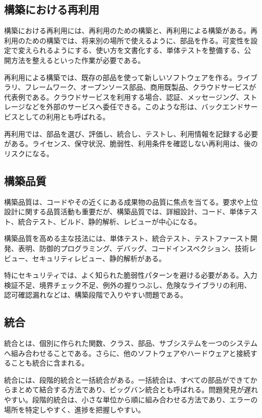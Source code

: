 \documentclass[a4paper,11pt,ja=standard,xelatex]{bxjsarticle}
\begin{document}
\subsection{構築における再利用}

構築における再利用には、再利用のための構築と、再利用による構築がある。再利用のための構築では、将来別の場所で使えるように、部品を作る。可変性を設定で変えられるようにする、使い方を文書化する、単体テストを整備する、公開方法を整えるといった作業が必要である。

再利用による構築では、既存の部品を使って新しいソフトウェアを作る。ライブラリ、フレームワーク、オープンソース部品、商用既製品、クラウドサービスが代表例である。クラウドサービスを利用する場合、認証、メッセージング、ストレージなどを外部のサービスへ委任できる。このような形は、バックエンドサービスとしての利用とも呼ばれる。

再利用では、部品を選び、評価し、統合し、テストし、利用情報を記録する必要がある。ライセンス、保守状況、脆弱性、利用条件を確認しない再利用は、後のリスクになる。

\subsection{構築品質}

構築品質は、コードやその近くにある成果物の品質に焦点を当てる。要求や上位設計に関する品質活動も重要だが、構築品質では、詳細設計、コード、単体テスト、統合テスト、ビルド、静的解析、レビューが中心になる。

構築品質を高める主な技法には、単体テスト、統合テスト、テストファースト開発、表明、防御的プログラミング、デバッグ、コードインスペクション、技術レビュー、セキュリティレビュー、静的解析がある。

特にセキュリティでは、よく知られた脆弱性パターンを避ける必要がある。入力検証不足、境界チェック不足、例外の握りつぶし、危険なライブラリの利用、認可確認漏れなどは、構築段階で入りやすい問題である。

\subsection{統合}

統合とは、個別に作られた関数、クラス、部品、サブシステムを一つのシステムへ組み合わせることである。さらに、他のソフトウェアやハードウェアと接続することも統合に含まれる。

統合には、段階的統合と一括統合がある。一括統合は、すべての部品ができてからまとめて結合する方法であり、ビッグバン統合とも呼ばれる。問題発見が遅れやすい。段階的統合は、小さな単位から順に組み合わせる方法であり、エラーの場所を特定しやすく、進捗を把握しやすい。
\end{document}
